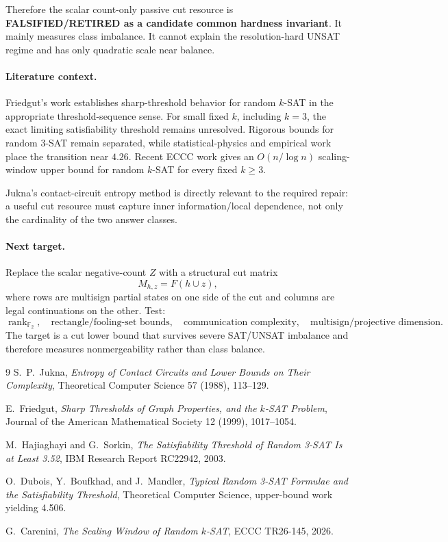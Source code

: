 Therefore the scalar count-only passive cut resource is \textbf{FALSIFIED/RETIRED as a candidate
common hardness invariant}. It mainly measures class imbalance. It cannot explain the
resolution-hard UNSAT regime and has only quadratic scale near balance.

\paragraph{Literature context.}
Friedgut's work establishes sharp-threshold behavior for random \(k\)-SAT in the appropriate
threshold-sequence sense. For small fixed \(k\), including \(k=3\), the exact limiting
satisfiability threshold remains unresolved. Rigorous bounds for random 3-SAT remain separated,
while statistical-physics and empirical work place the transition near \(4.26\).
Recent ECCC work gives an \(O(n/\log n)\) scaling-window upper bound for random \(k\)-SAT for
every fixed \(k\ge3\).

Jukna's contact-circuit entropy method is directly relevant to the required repair: a useful
cut resource must capture inner information/local dependence, not only the cardinality of the
two answer classes.

\paragraph{Next target.}
Replace the scalar negative-count \(Z\) with a structural cut matrix
\[
M_{h,z}=F(h\cup z),
\]
where rows are multisign partial states on one side of the cut and columns are legal
continuations on the other. Test:
\[
\operatorname{rank}_{\mathbb F_2},
\quad
\text{rectangle/fooling-set bounds},
\quad
\text{communication complexity},
\quad
\text{multisign/projective dimension}.
\]
The target is a cut lower bound that survives severe SAT/UNSAT imbalance and therefore measures
nonmergeability rather than class balance.

\begin{thebibliography}{9}
S.~P.~Jukna,
\emph{Entropy of Contact Circuits and Lower Bounds on Their Complexity},
Theoretical Computer Science 57 (1988), 113--129.

E.~Friedgut,
\emph{Sharp Thresholds of Graph Properties, and the \(k\)-SAT Problem},
Journal of the American Mathematical Society 12 (1999), 1017--1054.

M.~Hajiaghayi and G.~Sorkin,
\emph{The Satisfiability Threshold of Random 3-SAT Is at Least 3.52},
IBM Research Report RC22942, 2003.

O.~Dubois, Y.~Boufkhad, and J.~Mandler,
\emph{Typical Random 3-SAT Formulae and the Satisfiability Threshold},
Theoretical Computer Science, upper-bound work yielding 4.506.

G.~Carenini,
\emph{The Scaling Window of Random \(k\)-SAT},
ECCC TR26-145, 2026.
\end{thebibliography}

